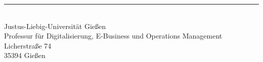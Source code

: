 \begin{titlepage}
\begin{center}
  \rule{\textwidth}{.4pt}\\ %
  Justus-Liebig-Universität Gießen\\
  Professur für Digitalisierung, E-Business und Operations Management\\
  Licherstraße 74 \\
  35394  Gießen\\
\end{center}

\end{titlepage} %

